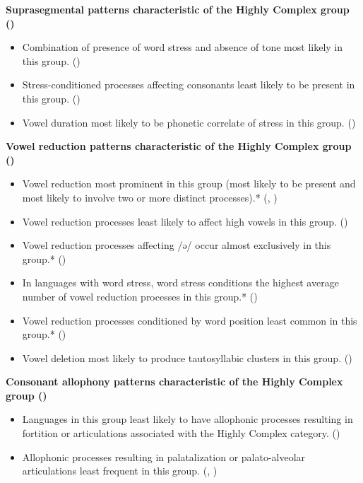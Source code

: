 \textbf{Suprasegmental patterns characteristic of the Highly Complex group ()}

\begin{itemize}
\item Combination of presence of word stress and absence of tone most likely in this group. {()}
\item Stress-conditioned processes affecting consonants least likely to be present in this group. ()
\item Vowel duration most likely to be phonetic correlate of stress in this group. {()}
\end{itemize}

\textbf{Vowel reduction patterns characteristic of the Highly Complex group ()}

\begin{itemize}
\item Vowel reduction most prominent in this group (most likely to be present and most likely to involve two or more distinct processes).* {(, )}
\item Vowel reduction processes least likely to affect high vowels in this group. {()}
\item Vowel reduction processes affecting /ə/ occur almost exclusively in this group.* ()
\item In languages with word stress, word stress conditions the highest average number of vowel reduction processes in this group.* ()
\item Vowel reduction processes conditioned by word position least common in this group.* ()
\item Vowel deletion most likely to produce tautosyllabic clusters in this group. ()
\end{itemize}

\textbf{Consonant allophony patterns characteristic of the Highly Complex group ()}

\begin{itemize}
\item Languages in this group least likely to have allophonic processes resulting in fortition or articulations associated with the Highly Complex category. (\textit{})
\item Allophonic processes resulting in palatalization or palato-alveolar articulations least frequent in this group. {(, )}
\end{itemize}

